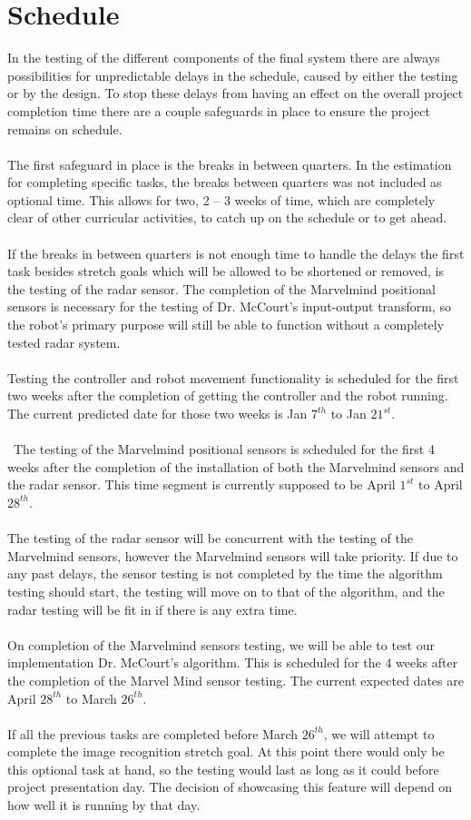 \documentclass[english,12pt]{article}
\begin{document}
\section{Schedule}
In the testing of the different components of the final system there are always possibilities 
for unpredictable delays in the schedule, caused by either the testing or by the design. 
To stop these delays from having an effect on the overall project completion time there are a 
couple safeguards in place to ensure the project remains on schedule.\\\\
The first safeguard in place is the breaks in between quarters. In the estimation for 
completing specific tasks, the breaks between quarters was not included as optional time. 
This allows for two, 2 – 3 weeks of time, which are completely clear of other curricular 
activities, to catch up on the schedule or to get ahead.\\\\
If the breaks in between quarters is not enough time to handle the delays the first task 
besides stretch goals which will be allowed to be shortened or removed, is the testing of 
the radar sensor. The completion of the Marvelmind positional sensors is necessary for the 
testing of Dr. McCourt’s input-output transform, so the robot’s primary purpose will still be able to 
function without a completely tested radar system.\\\\
Testing the controller and robot movement functionality is scheduled for the first two weeks 
after the completion of getting the controller and the robot running. The current predicted date 
for those two weeks is Jan $7^{th}$ to Jan $21^{st}$.\\\\\
The testing of the Marvelmind positional sensors is scheduled for the first 4 weeks after the 
completion of the installation of both the Marvelmind sensors and the radar sensor. This time 
segment is currently supposed to be April $1^{st}$ to April $28^{th}$.\\\\
The testing of the radar sensor will be concurrent with the testing of the Marvelmind sensors, 
however the Marvelmind sensors will take priority. If due to any past delays, the sensor testing 
is not completed by the time the algorithm testing should start, the testing will move on to that 
of the algorithm, and the radar testing will be fit in if there is any extra time.\\\\
On completion of the Marvelmind sensors testing, we will be able to test our implementation 
Dr. McCourt’s algorithm. This is scheduled for the 4 weeks after the completion of the Marvel 
Mind sensor testing. The current expected dates are April $28^{th}$ to March $26^{th}$.\\\\
If all the previous tasks are completed before March $26^{th}$, we will attempt to complete the image 
recognition stretch goal. At this point there would only be this optional task at hand, so the 
testing would last as long as it could before project presentation day. The decision of showcasing 
this feature will depend on how well it is running by that day.
\end{document}
